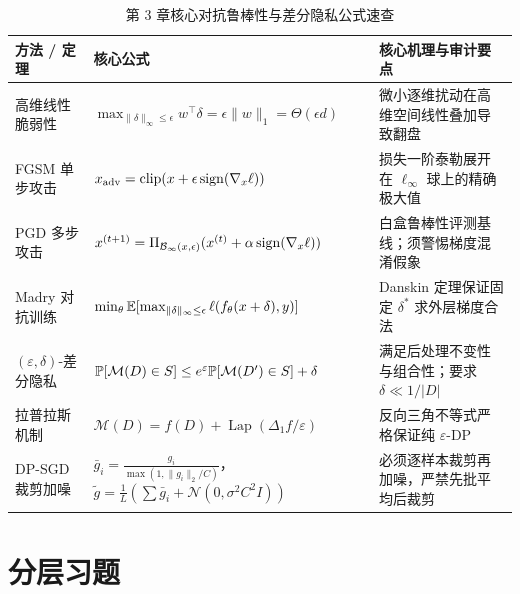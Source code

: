 \begin{table}[htbp]
  \centering
  \caption{第 3 章核心对抗鲁棒性与差分隐私公式速查}
  \label{tab:ch3-summary}
  \footnotesize
  \begin{tabularx}{\linewidth}{@{}p{33mm}p{60mm}X@{}}
    \toprule
    \textbf{方法 / 定理} & \textbf{核心公式} & \textbf{核心机理与审计要点} \\
    \midrule
    高维线性脆弱性 & $\max_{\|\delta\|_\infty\le\epsilon} w^\top\delta = \epsilon\|w\|_1 = \Theta(\epsilon d)$ & 微小逐维扰动在高维空间线性叠加导致翻盘 \\
    FGSM 单步攻击 & $x_{\text{adv}} = \mathrm{clip}(x + \epsilon\operatorname{sign}(\nabla_x \ell))$ & 损失一阶泰勒展开在 $\ell_\infty$ 球上的精确极大值 \\
    PGD 多步攻击 & $x^{(t+1)} = \Pi_{\mathcal{B}_\infty(x,\epsilon)}(x^{(t)} + \alpha\operatorname{sign}(\nabla_x\ell))$ & 白盒鲁棒性评测基线；须警惕梯度混淆假象 \\
    Madry 对抗训练 & $\min_\theta \mathbb{E}[\max_{\|\delta\|_\infty\le\epsilon}\ell(f_\theta(x+\delta),y)]$ & Danskin 定理保证固定 $\delta^*$ 求外层梯度合法 \\
    $(\varepsilon,\delta)$-差分隐私 & $\mathbb{P}[\mathcal{M}(D)\in S] \le e^\varepsilon \mathbb{P}[\mathcal{M}(D')\in S] + \delta$ & 满足后处理不变性与组合性；要求 $\delta \ll 1/|D|$ \\
    拉普拉斯机制 & $\mathcal{M}(D) = f(D) + \operatorname{Lap}(\Delta_1 f / \varepsilon)$ & 反向三角不等式严格保证纯 $\varepsilon$-DP \\
    DP-SGD 裁剪加噪 & $\bar{g}_i = \frac{g_i}{\max(1,\|g_i\|_2/C)}$，$\tilde{g} = \frac{1}{L}(\sum\bar{g}_i + \mathcal{N}(0,\sigma^2 C^2 I))$ & 必须逐样本裁剪再加噪，严禁先批平均后裁剪 \\
    \bottomrule
  \end{tabularx}
\end{table}

\section{分层习题}


